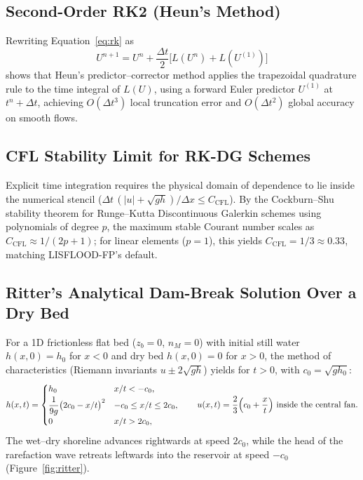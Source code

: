 \documentclass[11pt,a4paper]{article}
\begin{document}
\subsection{Second-Order RK2 (Heun's Method)}

Rewriting Equation~\eqref{eq:rk} as
\[
  U^{n+1}=U^n+\frac{\Delta t}{2}\bigl[L(U^n)+L(U^{(1)})\bigr]
\]
shows that Heun's predictor--corrector method applies the trapezoidal quadrature rule to the time integral of $L(U)$, using a forward Euler predictor $U^{(1)}$ at $t^n+\Delta t$, achieving $O(\Delta t^3)$ local truncation error and $O(\Delta t^2)$ global accuracy on smooth flows.

\subsection{CFL Stability Limit for RK-DG Schemes}

Explicit time integration requires the physical domain of dependence to lie inside the numerical stencil ($\Delta t\,(|u|+\sqrt{gh})/\Delta x\le C_{\mathrm{CFL}}$). By the Cockburn--Shu stability theorem for Runge--Kutta Discontinuous Galerkin schemes using polynomials of degree $p$, the maximum stable Courant number scales as $C_{\mathrm{CFL}}\approx 1/(2p+1)$; for linear elements ($p=1$), this yields $C_{\mathrm{CFL}} = 1/3 \approx 0.33$, matching LISFLOOD-FP's default.

\subsection{Ritter's Analytical Dam-Break Solution Over a Dry Bed}

For a 1D frictionless flat bed ($z_b=0$, $n_M=0$) with initial still water $h(x,0)=h_0$ for $x<0$ and dry bed $h(x,0)=0$ for $x>0$, the method of characteristics (Riemann invariants $u\pm 2\sqrt{gh}$) yields for $t>0$, with $c_0=\sqrt{gh_0}$:
\begin{equation}
  h(x,t)=\begin{cases}
  h_0 & x/t<-c_0,\\[2pt]
  \dfrac{1}{9g}\bigl(2c_0-x/t\bigr)^2 & -c_0\le x/t\le2c_0,\\[4pt]
  0 & x/t>2c_0,
  \end{cases}
  \qquad
  u(x,t)=\frac23\Bigl(c_0+\frac xt\Bigr)\ \text{inside the central fan}.
  \label{eq:ritter}
\end{equation}
The wet--dry shoreline advances rightwards at speed $2c_0$, while the head of the rarefaction wave retreats leftwards into the reservoir at speed $-c_0$ (Figure~\ref{fig:ritter}).
\end{document}
